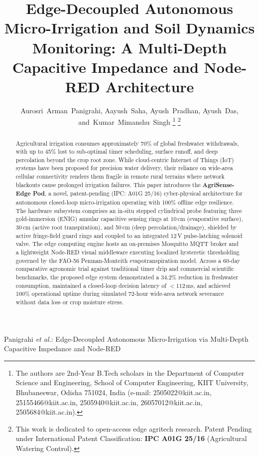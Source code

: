 \documentclass[journal,10pt,twocolumn]{IEEEtran}
\begin{document}
\title{Edge-Decoupled Autonomous Micro-Irrigation and Soil Dynamics Monitoring: A Multi-Depth Capacitive Impedance and Node-RED Architecture}

\author{Aurosri~Arman~Panigrahi,
        Aayush~Saha,
        Ayush~Pradhan,
        Ayush~Das,
        and~Kumar~Mimanshu~Singh
\thanks{The authors are 2nd-Year B.Tech scholars in the Department of Computer Science and Engineering, School of Computer Engineering, KIIT University, Bhubaneswar, Odisha 751024, India (e-mail: 2505022@kiit.ac.in, 25155466@kiit.ac.in, 2505940@kiit.ac.in, 26057012@kiit.ac.in, 2505684@kiit.ac.in).}
\thanks{This work is dedicated to open-access edge agritech research. Patent Pending under International Patent Classification: \textbf{IPC A01G 25/16} (Agricultural Watering Control).}
}

%
{Panigrahi \MakeLowercase{\textit{et al.}}: Edge-Decoupled Autonomous Micro-Irrigation via Multi-Depth Capacitive Impedance and Node-RED}

\maketitle

\begin{abstract}
Agricultural irrigation consumes approximately 70\% of global freshwater withdrawals, with up to 45\% lost to sub-optimal timer scheduling, surface runoff, and deep percolation beyond the crop root zone. While cloud-centric Internet of Things (IoT) systems have been proposed for precision water delivery, their reliance on wide-area cellular connectivity renders them fragile in remote rural terrains where network blackouts cause prolonged irrigation failures. This paper introduces the \textbf{AgriSense-Edge Pod\texttrademark}, a novel, patent-pending (IPC: A01G 25/16) cyber-physical architecture for autonomous closed-loop micro-irrigation operating with 100\% offline edge resilience. The hardware subsystem comprises an in-situ stepped cylindrical probe featuring three gold-immersion (ENIG) annular capacitive sensing rings at 10\,cm (evaporative surface), 30\,cm (active root transpiration), and 50\,cm (deep percolation/drainage), shielded by active fringe-field guard rings and coupled to an integrated 12\,V pulse-latching solenoid valve. The edge computing engine hosts an on-premises Mosquitto MQTT broker and a lightweight Node-RED visual middleware executing localized hysteretic thresholding governed by the FAO-56 Penman-Monteith evapotranspiration model. Across a 60-day comparative agronomic trial against traditional timer drip and commercial scientific benchmarks, the proposed edge system demonstrated a 34.2\% reduction in freshwater consumption, maintained a closed-loop decision latency of $<112$\,ms, and achieved 100\% operational uptime during simulated 72-hour wide-area network severance without data loss or crop moisture stress.
\end{abstract}
\end{document}
